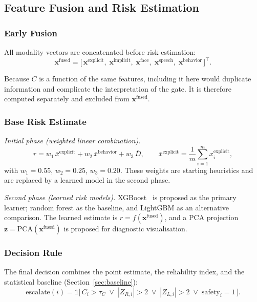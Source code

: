 \documentclass[12pt]{article}
\begin{document}
\subsection{Feature Fusion and Risk Estimation}

\subsubsection{Early Fusion}

All modality vectors are concatenated before risk estimation:
\begin{equation}
\mathbf{x}^{\text{fused}}
= \bigl[\,\mathbf{x}^{\text{explicit}},\; \mathbf{x}^{\text{implicit}},\;
\mathbf{x}^{\text{face}},\; \mathbf{x}^{\text{speech}},\;
\mathbf{x}^{\text{behavior}}\,\bigr]^{\top}.
\end{equation}

\noindent Because $C$ is a function of the same features, including it
here would duplicate information and complicate the interpretation of
the gate. It is therefore computed separately and excluded from
$\mathbf{x}^{\text{fused}}$.

\subsubsection{Base Risk Estimate}

\emph{Initial phase (weighted linear combination).}
\begin{equation}
r = w_{1}\,\bar{x}^{\text{explicit}}
  + w_{2}\,\bar{x}^{\text{behavior}}
  + w_{3}\,\bar{D},
\qquad
\bar{x}^{\text{explicit}} = \frac{1}{m}\sum_{i=1}^{m}x_i^{\text{explicit}},
\label{eq:linear-risk}
\end{equation}
with $w_{1}=0.55$, $w_{2}=0.25$, $w_{3}=0.20$. These weights are
starting heuristics and are replaced by a learned model in the second
phase.

\emph{Second phase (learned risk models).} XGBoost~\cite{chen2016xgboost}
is proposed as the primary learner; random forest as the baseline, and
LightGBM as an alternative comparison. The learned estimate is
$\hat{r} = f(\mathbf{x}^{\text{fused}})$, and a PCA projection
$\mathbf{z} = \text{PCA}(\mathbf{x}^{\text{fused}})$ is proposed for
diagnostic visualisation.

\subsubsection{Decision Rule}

The final decision combines the point estimate, the reliability index,
and the statistical baseline (Section~\ref{sec:baseline}):
\begin{equation}
\text{escalate}(i) =
\mathbb{1}\bigl[\,C_i > \tau_C \;\lor\; |Z_{R,i}| > 2
\;\lor\; |Z_{L,i}| > 2 \;\lor\; \text{safety}_i = 1\,\bigr].
\label{eq:decision}
\end{equation}
\end{document}
